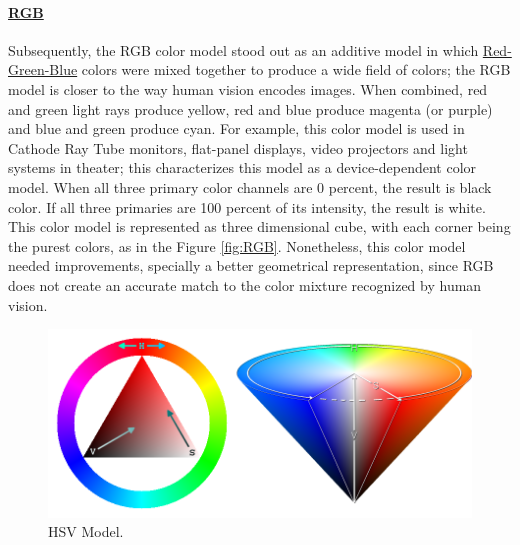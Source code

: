 \paragraph{\ul{RGB}} Subsequently, the RGB color model stood out as an additive
model in which \ul{Red-Green-Blue} colors were mixed together to produce a wide field of colors;
the RGB model is closer to the way human vision encodes images. When combined, red and green light rays
produce yellow, red and blue produce magenta (or purple) and blue and green produce cyan. For example,
this color model is used in Cathode Ray Tube monitors, flat-panel displays, video projectors and
light systems in theater; this characterizes this model as a device-dependent color model. When all
three primary color channels are 0 percent, the result is black color. If all three primaries are 100
percent of its intensity, the result is white. This color model is represented as three dimensional cube,
with each corner being the purest colors, as in the Figure \ref{fig:RGB}.
Nonetheless, this color model needed improvements, specially a better geometrical representation, since RGB does not create
an accurate match to the color mixture recognized by human vision.
%
\begin{figure}
	\centering
	\vspace{-10pt}
	\includegraphics[width=\linewidth]{images/background/HSV_TriangleCone.png}
	\caption[HSV Triangle and Cone Representation]{HSV Model.\protect\footnotemark{}}
	\label{fig:HSV}
\end{figure}
%
